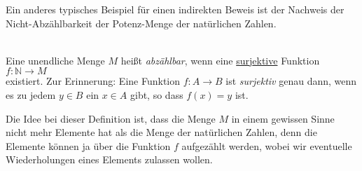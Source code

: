 Ein anderes typisches Beispiel für einen indirekten Beweis ist der Nachweis der
Nicht-Abzählbarkeit der Potenz-Menge der natürlichen Zahlen.

\begin{Definition}[Abzählbar] \hspace*{\fill} \\
Eine unendliche Menge $M$ heißt \emph{abzählbar}, wenn eine 
\underline{sur}j\underline{ektive} Funktion
\\[0.2cm]
\hspace*{1.3cm}
$f: \mathbb{N} \rightarrow M$
\\[0.2cm]
existiert.  Zur Erinnerung: Eine Funktion $f:A \rightarrow B$ ist \emph{surjektiv} genau
dann, wenn es zu jedem $y \in B$ ein $x \in A$ gibt, so dass $f(x) = y$ ist.
\end{Definition}

Die Idee bei dieser Definition ist, dass die Menge  $M$ in einem gewissen Sinne nicht mehr Elemente hat
als die Menge der natürlichen Zahlen, denn die Elemente können ja über die Funktion $f$
aufgezählt werden, wobei wir eventuelle Wiederholungen eines Elements zulassen wollen.

